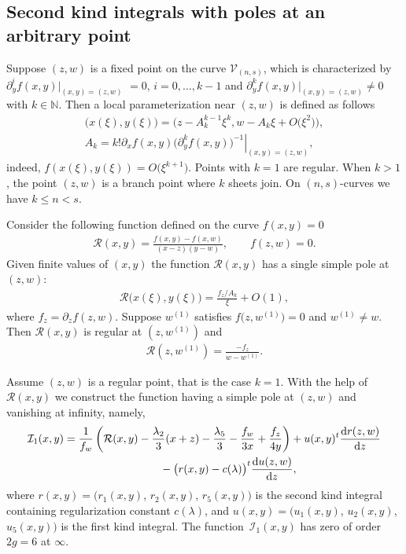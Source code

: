 \documentclass[pdftex]{sigma}
\numberwithin{equation}{section}
\newcommand{\rmd}{\mathrm{d}}
\begin{document}
\subsection{Second kind integrals with poles at an arbitrary point}\label{IntArbP}
Suppose $(z,w)$ is a fixed point on the curve $\mathcal{V}_{(n,s)}$, which is characterized by $\partial_y^i f(x,y)|_{(x,y)=(z,w)}$ $=0$, $i=0,\dots,k-1$ and $\partial_y^k f(x,y)|_{(x,y)=(z,w)}\neq 0$ with $k\in \mathbb{N}$. Then a local parameterization near $(z,w)$ is defined as follows
\begin{gather}
 \big(x(\xi),y(\xi)\big)= \big(z-A_k^{k-1} \xi^k, w - A_k \xi + O\big(\xi^2\big)\big),\nonumber\\
 A_k = \left. k! \partial_x f(x,y)
 \big(\partial^k_y f(x,y)\big)^{-1} \right|_{(x,y)=(z,w)},\label{zwPrmt}
\end{gather}
indeed, $f(x(\xi),y(\xi))=O\big(\xi^{k+1}\big)$. Points with $k=1$ are regular. When $k>1$, the point $(z,w)$ is a branch point where $k$ sheets join. On $(n,s)$-curves we have $k\leqslant n < s$.

Consider the following function defined on the curve $f(x,y)=0$
\begin{gather*}
 \mathcal{R}(x,y) = \frac{f(x,y)-f(x,w)}{(x-z)(y-w)},\qquad f(z,w)=0.
\end{gather*}
Given finite values of $(x,y)$ the function $\mathcal{R}(x,y)$ has a single simple pole at $(z,w)$:
\begin{gather}
 \mathcal{R}\big(x(\xi),y(\xi) \big)= \frac{f_z/A_k}{\xi} + O(1),\label{Rser}
\end{gather}
where $f_z=\partial_z f(z,w)$.
Suppose $w^{(1)}$ satisfies $f\big(z,w^{(1)}\big)=0$ and $w^{(1)}\neq w$. Then $\mathcal{R}(x,y)$ is regular at $(z,w^{(1)})$ and
\begin{gather*}
 \mathcal{R}(z,w^{(1)})= \frac{-f_z}{w-w^{(1)}}.
\end{gather*}

Assume $(z,w)$ is a regular point, that is the case $k=1$. With the help of $\mathcal{R}(x,y)$ we construct the function having a simple pole at $(z,w)$ and vanishing at infinity, namely,
\begin{gather*}
 \mathcal{I}_1(x,y) = \frac{1}{f_w} \left(\mathcal{R}(x,y)
 -\frac{\lambda_2}{3}(x+z) - \frac{\lambda_5}{3}
 -\frac{f_w}{3 x} + \frac{f_z}{4 y} \right) + u(x,y)^t\frac{\rmd r(z,w)}{\rmd z}\\
 \hphantom{\mathcal{I}_1(x,y) =}{} - \big(r(x,y)-c(\lambda)\big)^t\frac{\rmd u(z,w)}{\rmd z},
\end{gather*}
where $r(x,y)=\big(r_1(x,y)$, $r_2(x,y)$, $r_5(x,y)\big)$ is the second kind integral containing regularization constant $c(\lambda)$, and $u(x,y)=\big(u_1(x,y)$, $u_2(x,y)$, $u_5(x,y)\big)$ is the first kind integral. The func\-tion~$\mathcal{I}_1(x,y)$ has zero of order $2g=6$ at $\infty$.
\end{document}
